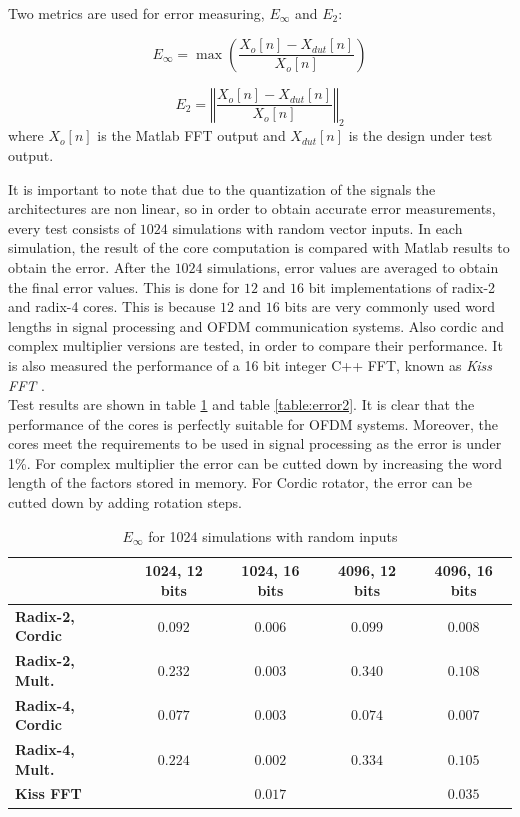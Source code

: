 \documentclass[conference]{IEEEtran}
\begin{document}
Two metrics are used for error measuring, $E_\infty$ and $E_2$:

\begin{equation}
E_\infty = \max\left(\frac{ X_o[n] - X_{dut}[n]}{X_o[n]}\right)
\label{eq:norma1}
\end{equation}

\begin{equation}
E_2 = \left\Vert\frac{X_o[n] - X_{dut}[n]}{X_o[n]}\right\Vert_2
\label{eq:norma2}
\end{equation}
where $X_o[n]$ is the Matlab FFT output and $X_{dut}[n]$ is the design under test output.

It is important to note that due to the quantization of the signals the architectures are non linear, so in order to obtain accurate 
error measurements, every test consists of $1024$ simulations with random vector inputs.
In each simulation, the result of the core computation is compared with Matlab results to obtain the error. After the $1024$ simulations, 
error values are averaged to obtain the final error values.
This is done for $12$ and $16$ bit implementations of radix-2 and radix-4 cores. This is because $12$ 
and $16$ bits are very commonly used word lengths in signal processing and OFDM communication systems. 
Also cordic and complex multiplier versions are tested, in order to compare their performance.
It is also measured the performance of a 16 bit integer C++ FFT, known as \emph{Kiss FFT} \cite{KISSFFT}.\\
Test results are shown in table \ref{table:errorInf} and table \ref{table:error2}. It is clear that the performance of the cores is perfectly suitable for OFDM systems. 
Moreover, the cores meet the requirements to be used in signal processing as the error is under 1\%. For complex multiplier the error can be cutted down by increasing the word 
length of the factors stored in memory. For Cordic rotator, the error can be cutted down by adding rotation steps.\\

\begin{table}[htb!]
\caption{$E_\infty$ for 1024 simulations with random inputs}
\begin{tabular}{l c c c c}
 & \textbf{1024, 12 bits} & \textbf{1024, 16 bits} & \textbf{4096, 12 bits} & \textbf{4096, 16 bits}\\ \hline 
\textbf{Radix-2, Cordic} & $0.092$ & $0.006$ & $0.099$ & $0.008 $\\
\textbf{Radix-2, Mult.} & $0.232$ & $0.003$ & $0.340$ & $0.108$\\
\textbf{Radix-4, Cordic} & $0.077$ & $0.003$ & $0.074$ & $0.007$\\
\textbf{Radix-4, Mult.} & $0.224$ & $0.002$ & $0.334$ & $0.105$\\
\textbf{Kiss FFT} & $ $ & $0.017$ & $ $ & $0.035$\\\hline
\end{tabular}
\label{table:errorInf}
\end{table}
\end{document}
